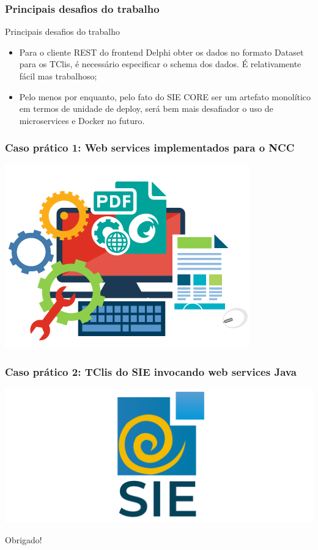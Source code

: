 \documentclass{beamer}
\begin{document}
\begin{frame}
\frametitle{Principais desafios do trabalho}

\begin{exampleblock}{Principais desafios do trabalho}
\small{
	\begin{itemize}
		\item<1->Para o cliente REST do frontend Delphi obter os dados no formato Dataset para os TClis, é necessário especificar o schema dos dados. É relativamente fácil mas trabalhoso;
		\item<1->Pelo menos por enquanto, pelo fato do SIE CORE ser um artefato monolítico em termos de unidade de deploy, será bem mais desafiador o uso de microservices e Docker no futuro.
	\end{itemize}
}
\end{exampleblock}

\end{frame}




\begin{frame}
  \frametitle{Caso prático 1: Web services implementados para o NCC}

	\centering
	\includegraphics[scale=0.4]{img/sdk.png}
  
\end{frame}


\begin{frame}
  \frametitle{Caso prático 2: TClis do SIE invocando web services Java}

	\centering
	\includegraphics[scale=0.4]{img/sie.png}
  
\end{frame}






\begin{frame}[c]{ }
\centering
  \huge{Obrigado!}
\end{frame}
\end{document}
